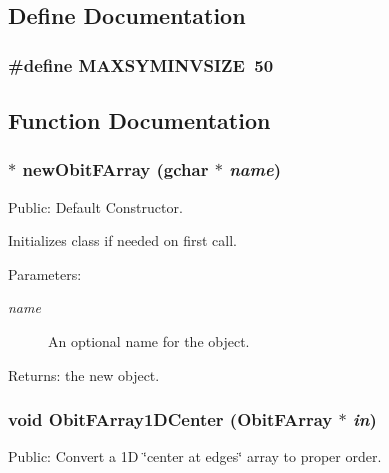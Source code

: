 \subsection{Define Documentation}
\subsubsection{\setlength{\rightskip}{0pt plus 5cm}\#define MAXSYMINVSIZE\ 50}\label{ObitFArray_8c_a0}




\subsection{Function Documentation}
\subsubsection{$\ast$ new\-Obit\-FArray (gchar $\ast$ {\em name})}\label{ObitFArray_8c_a14}


Public: Default Constructor. 

Initializes class if needed on first call. \begin{Desc}
\item[Parameters:]
\begin{description}
\item[{\em name}]An optional name for the object. \end{description}
\end{Desc}
\begin{Desc}
\item[Returns:]the new object. \end{Desc}
\subsubsection{\setlength{\rightskip}{0pt plus 5cm}void Obit\-FArray1DCenter ({\bf Obit\-FArray} $\ast$ {\em in})}\label{ObitFArray_8c_a59}


Public: Convert a 1D \char`\"{}center at edges\char`\"{} array to proper order. 

